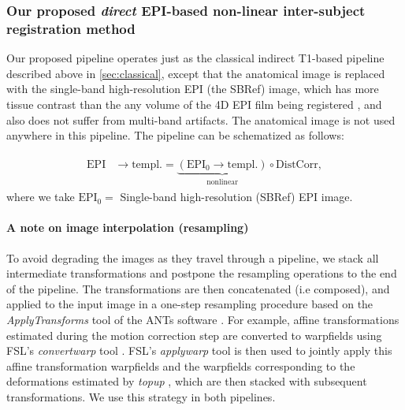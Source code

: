 
\subsubsection{Our proposed \textit{direct} EPI-based non-linear  inter-subject
  registration method}
\label{sec:proposed}
Our proposed pipeline operates just as the
classical indirect T1-based pipeline described above in
\ref{sec:classical}, except that the anatomical image is replaced with
the single-band high-resolution EPI (the SBRef) image, which has more tissue contrast than the any volume of the 4D EPI film being registered
\cite{glasser2013}, and also does not suffer from multi-band artifacts. The anatomical image is not used anywhere in
this pipeline.  The pipeline can be schematized as follows:

\begin{eqnarray}
  \begin{split}
    \text{EPI} &\rightarrow \text{templ.}
    = \underbrace{(\text{EPI}_0 \rightarrow \text{templ.})}_{\text{nonlinear}} \circ  \text{DistCorr},
    \label{eq:dcsbref_pl}
    \end{split}
\end{eqnarray}
where we take $\text{EPI}_0 = $ Single-band high-resolution (SBRef) EPI image.

\paragraph{A note on image interpolation (resampling)}
To avoid degrading the images as they travel through a pipeline, we
stack all intermediate transformations and postpone the resampling
operations to the end of the pipeline. The transformations are then
concatenated (i.e composed), and applied to the input image in a
one-step resampling procedure based on the \textit{ApplyTransforms}
tool of the ANTs software \cite{avants2008,avants2009advanced}. For
example,  affine transformations estimated during the
motion correction step are converted to warpfields using FSL's
\textit{convertwarp} tool \cite{smith2004}. FSL's \textit{applywarp}
tool \cite{smith2004} is then used to jointly apply this affine
transformation warpfields and the warpfields corresponding to the
deformations estimated by \textit{topup} \cite{smith2004}, which
are then stacked with subsequent transformations. We use this strategy in both pipelines.

